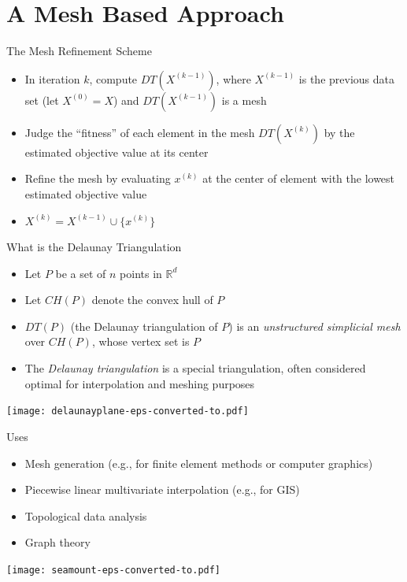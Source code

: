 \documentclass[xcolor=dvipsnames]{beamer}
\begin{document}
\section{A Mesh Based Approach}
\begin{frame}{The Mesh Refinement Scheme}
\begin{itemize}
\item In iteration $k$, compute $DT(X^{(k-1)})$, where $X^{(k-1)}$ is the
previous data set (let $X^{(0)} = X$) and $DT(X^{(k-1)})$ is a mesh\\
\pause
\item Judge the ``fitness'' of each element in the mesh
$DT(X^{(k)})$ by the estimated objective value at its center\\
\pause
\item Refine the mesh by evaluating $x^{(k)}$ at the center of element
with the lowest estimated objective value\\
\pause
\item $X^{(k)} = X^{(k-1)} \cup \{x^{(k)}\}$
\end{itemize}
\end{frame}

\begin{frame}{What is the Delaunay Triangulation}
\begin{itemize}
\item Let $P$ be a set of $n$ points in $\mathbb{R}^d$
\item Let $CH(P)$ denote the convex hull of $P$
\item $DT(P)$ (the Delaunay triangulation of $P$) is an 
{\it unstructured simplicial mesh} over $CH(P)$, whose vertex set is $P$
\item The {\it Delaunay triangulation} is a special triangulation, often
considered optimal for interpolation and meshing purposes
\end{itemize}
\begin{center}
\texttt{[image: delaunayplane-eps-converted-to.pdf]}
\end{center}
\end{frame}
\begin{frame}{Uses}
\begin{itemize}
\item Mesh generation (e.g., for finite element methods or computer graphics)
\item Piecewise linear multivariate interpolation (e.g., for GIS)
\item Topological data analysis
\item Graph theory
\end{itemize}
\begin{center}
\texttt{[image: seamount-eps-converted-to.pdf]}
\end{center}
\end{frame}
\end{document}
